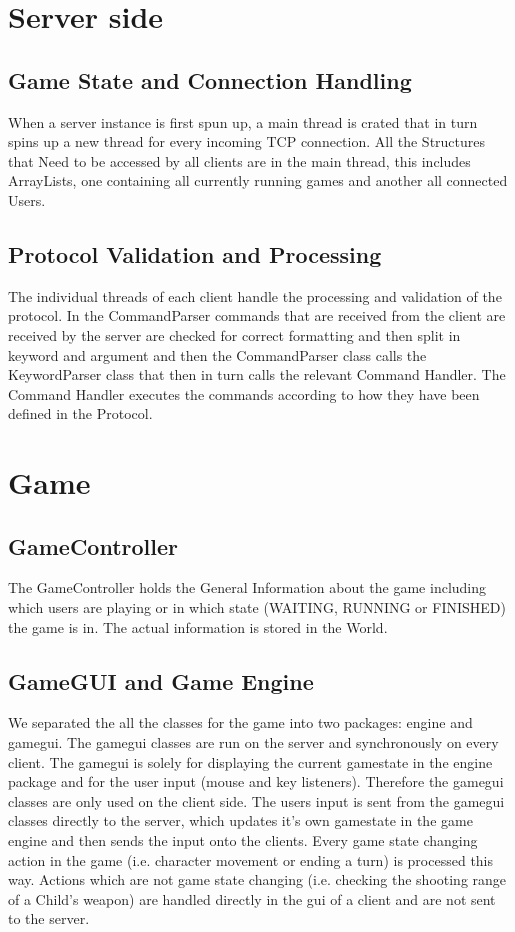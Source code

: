 \documentclass[11pt,a4paper]{article}
\begin{document}
	\section{Server side}
		\subsection{Game State and Connection Handling}
		When a server instance is first spun up, a main thread is crated that in turn spins up a new thread for every incoming TCP connection. All the Structures that Need to be accessed by all clients are in the main thread, this includes ArrayLists, one containing all currently running games and another all connected Users.
		\subsection{Protocol Validation and Processing}
		The individual threads of each client handle the processing and validation of the protocol. In the CommandParser commands that are received from the client are received by the server are checked for correct formatting and then split in keyword and argument and then the CommandParser class calls the KeywordParser class that then in turn calls the relevant Command Handler. The Command Handler executes the commands according to how they have been defined in the Protocol.
		\clearpage 
	\section{Game}
		\subsection{GameController}
		The GameController holds the General Information about the game including which users are playing or in which state (WAITING, RUNNING or FINISHED) the game is in. The actual information is stored in the World.
		\subsection{GameGUI and Game Engine}
		We separated the all the classes for the game into two packages: engine and gamegui. The gamegui classes are run on the server and synchronously on every client. The gamegui is solely for displaying the current gamestate in the engine package and for the user input (mouse and key listeners). Therefore the gamegui classes are only used on the client side. The users input is sent from the gamegui classes directly to the server, which updates it's own gamestate in the game engine and then sends the input onto the clients. Every game state changing action in the game (i.e. character movement or ending a turn) is processed this way. Actions which are not game state changing (i.e. checking the shooting range of a Child's weapon) are handled directly in the gui of a client and are not sent to the server.
\end{document}
